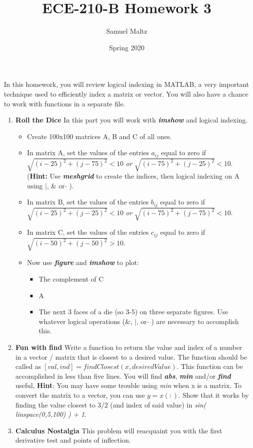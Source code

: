 \documentclass[11pt]{article}
\title{ECE-210-B Homework 3}
\author{Samuel Maltz}
\date{Spring 2020}
\begin{document}
\noindent In this homework, you will review logical indexing in MATLAB, a very important technique used to efficiently index a matrix or vector. You will also have a chance to work with functions in a separate file.
\begin{enumerate}
\item \textbf{Roll the Dice} In this part you will work with \textbf{\textit{imshow}} and logical indexing.
	\begin{itemize}
		\item Create 100x100 matrices A, B and C of all ones.
		\item In matrix A, set the values of the entries $a_{ij}$ equal to zero if $\sqrt{(i-25)^2+(j-75)^2}<10$ \textit{or} $\sqrt{(i-75)^2+(j-25)^2}<10$. (\textbf{Hint:} Use \textbf{\textit{meshgrid}} to create the indices, then logical indexing on A using $|$, \& or $\tilde{}$ ).
		\item In matrix B, set the values of the entries $b_{ij}$ equal to zero if $\sqrt{(i-25)^2+(j-25)^2}<10$ \textit{or} $\sqrt{(i-75)^2+(j-75)^2}<10$.
		\item In matrix C, set the values of the entries $c_{ij}$ equal to zero if $\sqrt{(i-50)^2+(j-50)^2}>10$.
		\item Now use \textbf{\textit{figure}} and \textbf{\textit{imshow}} to plot:
			\begin{itemize}
				\item The complement of C
				\item A
				\item The next 3 faces of a die (so 3-5) on three separate figures. Use whatever logical operations (\&, $|$, or $\tilde{}$ ) are necessary to accomplish this.
			\end{itemize}
	\end{itemize}
\item \textbf{Fun with find} Write a function to return the value and index of a number in a vector / matrix that is closest to a desired value. The function should be called as $[val, ind] = findClosest(x, desiredValue)$. This function can be accomplished in less than five lines. You will find \textbf{\textit{abs}}, \textbf{\textit{min}} and/or \textbf{\textit{find}} useful, \textbf{Hint}: You may have some trouble using \emph{min} when x is a matrix. To convert the matrix to a vector, you can use $y = x(:)$.  Show that it works by finding the value closest to $3/2$ (and index of said value) in \emph{sin( linspace(0,5,100) ) + 1}.
\item \textbf{Calculus Nostalgia} This problem will reacquaint you with the first derivative test and points of inflection.

\end{enumerate}
\end{document}

